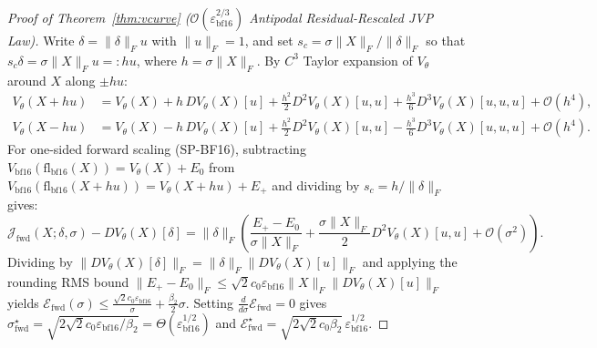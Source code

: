 \documentclass[11pt,a4paper]{article}
\theoremstyle{definition}
\theoremstyle{remark}
\newcommand{\epsbf}{\varepsilon_{\mathrm{bf16}}}
\begin{document}
\begin{proof}[Proof of Theorem~\ref{thm:vcurve} ($\mathcal{O}(\epsbf^{2/3})$ Antipodal Residual-Rescaled JVP Law)]
Write $\delta = \|\delta\|_F u$ with $\|u\|_F = 1$, and set $s_c = \sigma \|X\|_F / \|\delta\|_F$ so that $s_c \delta = \sigma \|X\|_F u =: h u$, where $h = \sigma \|X\|_F$. By $C^3$ Taylor expansion of $V_\theta$ around $X$ along $\pm h u$:
\begin{align}
    V_\theta(X + h u) &= V_\theta(X) + h \, D V_\theta(X)[u] + \frac{h^2}{2} D^2 V_\theta(X)[u, u] + \frac{h^3}{6} D^3 V_\theta(X)[u, u, u] + \mathcal{O}(h^4), \label{eq:tay_p}\\
    V_\theta(X - h u) &= V_\theta(X) - h \, D V_\theta(X)[u] + \frac{h^2}{2} D^2 V_\theta(X)[u, u] - \frac{h^3}{6} D^3 V_\theta(X)[u, u, u] + \mathcal{O}(h^4). \label{eq:tay_m}
\end{align}
For one-sided forward scaling (\textsc{SP-BF16}), subtracting $V_{\mathrm{bf16}}(\mathrm{fl}_{\mathrm{bf16}}(X)) = V_\theta(X) + E_0$ from $V_{\mathrm{bf16}}(\mathrm{fl}_{\mathrm{bf16}}(X + h u)) = V_\theta(X + h u) + E_+$ and dividing by $s_c = h / \|\delta\|_F$ gives:
\begin{equation*}
    \mathcal{J}_{\mathrm{fwd}}(X; \delta, \sigma) - D V_\theta(X)[\delta] = \|\delta\|_F \left(\frac{E_+ - E_0}{\sigma \|X\|_F} + \frac{\sigma \|X\|_F}{2} D^2 V_\theta(X)[u, u] + \mathcal{O}(\sigma^2)\right).
\end{equation*}
Dividing by $\|D V_\theta(X)[\delta]\|_F = \|\delta\|_F \|D V_\theta(X)[u]\|_F$ and applying the rounding RMS bound $\|E_+ - E_0\|_F \le \sqrt{2} c_0 \epsbf \|X\|_F \|D V_\theta(X)[u]\|_F$ yields $\mathcal{E}_{\mathrm{fwd}}(\sigma) \le \frac{\sqrt{2}c_0\epsbf}{\sigma} + \frac{\beta_2}{2}\sigma$. Setting $\frac{d}{d\sigma}\mathcal{E}_{\mathrm{fwd}} = 0$ gives $\sigma_{\mathrm{fwd}}^\star = \sqrt{2\sqrt{2}c_0\epsbf / \beta_2} = \Theta(\epsbf^{1/2})$ and $\mathcal{E}_{\mathrm{fwd}}^\star = \sqrt{2\sqrt{2}c_0 \beta_2}\,\epsbf^{1/2}$.


\end{proof}
\end{document}

